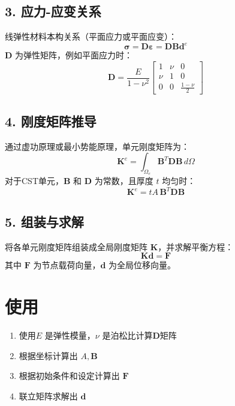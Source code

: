 \documentclass{ctexart}
\begin{document}
\subsection*{3. 应力-应变关系}
线弹性材料本构关系（平面应力或平面应变）：
\[
\bm{\sigma} = \mathbf{D} \bm{\varepsilon} = \mathbf{D} \mathbf{B} \mathbf{d}^e
\]
$\mathbf{D}$ 为弹性矩阵，例如平面应力时：
\[
\mathbf{D} = \frac{E}{1-\nu^2} \begin{bmatrix} 
1 & \nu & 0 \\ 
\nu & 1 & 0 \\ 
0 & 0 & \frac{1-\nu}{2} 
\end{bmatrix}
\]

\subsection*{4. 刚度矩阵推导}
通过虚功原理或最小势能原理，单元刚度矩阵为：
\[
\mathbf{K}^e = \int_{\Omega_e} \mathbf{B}^T \mathbf{D} \mathbf{B} \, d\Omega
\]
对于CST单元，$\mathbf{B}$ 和 $\mathbf{D}$ 为常数，且厚度 $t$ 均匀时：
\[
\mathbf{K}^e = t A \, \mathbf{B}^T \mathbf{D} \mathbf{B}
\]

\subsection*{5. 组装与求解}
将各单元刚度矩阵组装成全局刚度矩阵 $\mathbf{K}$，并求解平衡方程：
\[
\mathbf{K} \mathbf{d} = \mathbf{F}
\]
其中 $\mathbf{F}$ 为节点载荷向量，$\mathbf{d}$ 为全局位移向量。

\section*{使用}

\begin{enumerate}
\item 使用$E$ 是弹性模量，$\nu$ 是泊松比计算$\mathbf{D}$矩阵
\item 根据坐标计算出 $A, \mathbf{B}$
\item 根据初始条件和设定计算出 $\mathbf{F}$
\item 联立矩阵求解出 $\mathbf{d}$
\end{enumerate}
\end{document}
